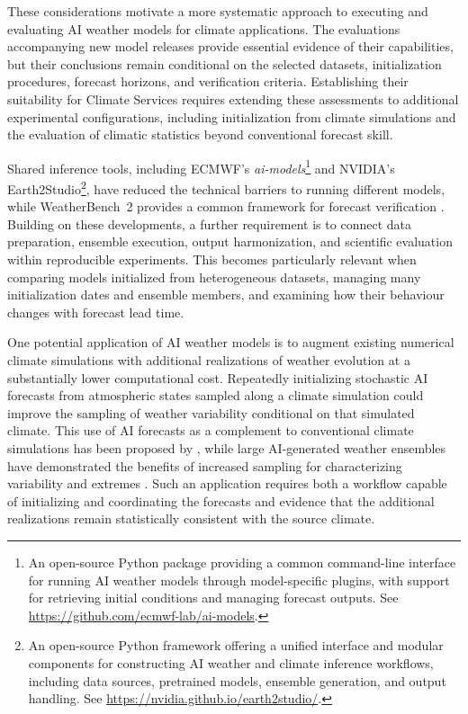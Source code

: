 These considerations motivate a more systematic approach to executing and evaluating AI weather models for climate applications. The evaluations accompanying new model releases provide essential evidence of their capabilities, but their conclusions remain conditional on the selected datasets, initialization procedures, forecast horizons, and verification criteria. Establishing their suitability for Climate Services requires extending these assessments to additional experimental configurations, including initialization from climate simulations and the evaluation of climatic statistics beyond conventional forecast skill.

Shared inference tools, including ECMWF's \emph{ai-models}\footnote{An open-source Python package providing a common command-line interface for running AI weather models through model-specific plugins, with support for retrieving initial conditions and managing forecast outputs. See \url{https://github.com/ecmwf-lab/ai-models}.} and NVIDIA's Earth2Studio\footnote{An open-source Python framework offering a unified interface and modular components for constructing AI weather and climate inference workflows, including data sources, pretrained models, ensemble generation, and output handling. See \url{https://nvidia.github.io/earth2studio/}.}, have reduced the technical barriers to running different models, while WeatherBench~2 provides a common framework for forecast verification \citep{rasp_weatherbench_2024}. Building on these developments, a further requirement is to connect data preparation, ensemble execution, output harmonization, and scientific evaluation within reproducible experiments. This becomes particularly relevant when comparing models initialized from heterogeneous datasets, managing many initialization dates and ensemble members, and examining how their behaviour changes with forecast lead time.

One potential application of AI weather models is to augment existing numerical climate simulations with additional realizations of weather evolution at a substantially lower computational cost. Repeatedly initializing stochastic AI forecasts from atmospheric states sampled along a climate simulation could improve the sampling of weather variability conditional on that simulated climate. This use of AI forecasts as a complement to conventional climate simulations has been proposed by \citet{rackow_robustness_2024}, while large AI-generated weather ensembles have demonstrated the benefits of increased sampling for characterizing variability and extremes \citep{mahesh_huge_2025}. Such an application requires both a workflow capable of initializing and coordinating the forecasts and evidence that the additional realizations remain statistically consistent with the source climate.

